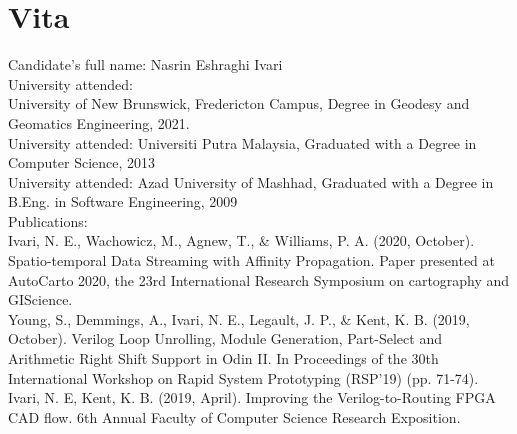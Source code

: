 \clearpage
{}  %
\chapter*{Vita}
\pagestyle{empty}
\thispagestyle{empty}
\singlespacing
Candidate's full name: Nasrin Eshraghi Ivari\\
University attended: \\

University of New Brunswick, Fredericton Campus, Degree in Geodesy and Geomatics Engineering, 2021.\\

University attended: Universiti Putra Malaysia, Graduated with a Degree in Computer Science, 2013\\

University attended: Azad University of Mashhad, Graduated with a Degree in B.Eng. in Software Engineering, 2009\\


Publications:\\

Ivari, N. E., Wachowicz, M., Agnew, T., \& Williams, P. A. (2020, October). Spatio-temporal Data Streaming with Affinity Propagation. Paper presented at AutoCarto 2020, the 23rd International Research Symposium on cartography and GIScience.\\


Young, S., Demmings, A., Ivari, N. E., Legault, J. P., \& Kent, K. B. (2019, October). Verilog Loop Unrolling, Module Generation, Part-Select and Arithmetic Right Shift Support in Odin II. In Proceedings of the 30th International Workshop on Rapid System Prototyping (RSP'19) (pp. 71-74).\\


Ivari, N. E, Kent, K. B. (2019, April). Improving the Verilog-to-Routing FPGA CAD flow. 6th Annual Faculty of Computer Science Research Exposition.\\


